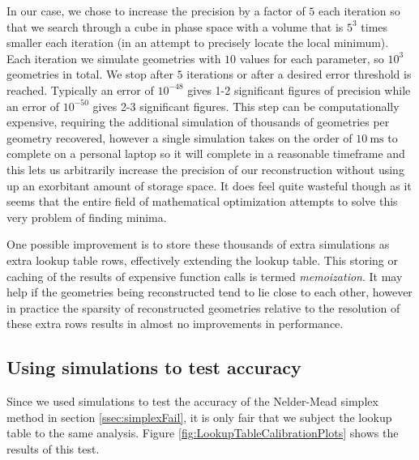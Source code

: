 In our case, we chose to increase the precision by a factor of $5$ each iteration so that we search through a cube in phase space with a volume that is $5^3$ times smaller each iteration (in an attempt to precisely locate the local minimum). Each iteration we simulate geometries with $10$ values for each parameter, so $10^3$ geometries in total. We stop after $5$ iterations or after a desired error threshold is reached. Typically an error of $10^{-48}$ gives 1-2 significant figures of precision while an error of $10^{-50}$ gives 2-3 significant figures. This step can be computationally expensive, requiring the additional simulation of thousands of geometries per geometry recovered, however a single simulation takes on the order of $\SI{10}{\ms}$ to complete on a personal laptop so it will complete in a reasonable timeframe and this lets us arbitrarily increase the precision of our reconstruction without using up an exorbitant amount of storage space. It does feel quite wasteful though as it seems that the entire field of mathematical optimization attempts to solve this very problem of finding minima.

One possible improvement is to store these thousands of extra simulations as extra lookup table rows, effectively extending the lookup table. This storing or caching of the results of expensive function calls is termed \emph{memoization}. It may help if the geometries being reconstructed tend to lie close to each other, however in practice the sparsity of reconstructed geometries relative to the resolution of these extra rows results in almost no improvements in performance.

\subsection{Using simulations to test accuracy} \label{ssec:LTaccuracy}
Since we used simulations to test the accuracy of the Nelder-Mead simplex method in section \ref{ssec:simplexFail}, it is only fair that we subject the lookup table to the same analysis. Figure \ref{fig:LookupTableCalibrationPlots} shows the results of this test.

